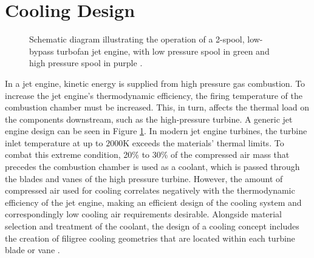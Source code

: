 \documentclass[a4paper, 11pt]{report}
\theoremstyle{definition}
\begin{document}
	\section{Cooling Design}
		\begin{figure}[H]
			\centering
			
			\caption{Schematic diagram illustrating the operation of a 2-spool, low-bypass turbofan jet engine, with low pressure spool in green and high pressure spool in purple \cite{Aainsqatsi2008}.}
			\label{fig:turbofan_schematic}
		\end{figure}

		In a jet engine, kinetic energy is supplied from high pressure gas combustion. To increase the jet engine’s thermodynamic efficiency, the firing temperature of the combustion chamber must be increased. This, in turn, affects the thermal load on the components downstream, such as the high-pressure turbine. A generic jet engine design can be seen in Figure \ref{fig:turbofan_schematic}. In modern jet engine turbines, the turbine inlet temperature at up to $2000$K exceeds the materials’ thermal limits. To combat this extreme condition, 20\% to 30\% of the compressed air mass that precedes the combustion chamber is used as a coolant, which is passed through the blades and vanes of the high pressure turbine. However, the amount of compressed air used for cooling correlates negatively with the thermodynamic efficiency of the jet engine, making an efficient design of the cooling system and correspondingly low cooling air requirements desirable. Alongside material selection and treatment of the coolant, the design of a cooling concept includes the creation of filigree cooling geometries that are located within each turbine blade or vane \cite{Giampaolo2020}.
\end{document}
